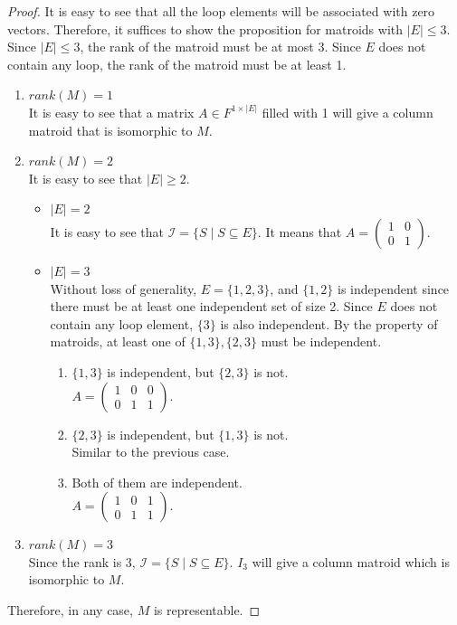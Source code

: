 \begin{proof}
It is easy to see that all the loop elements will be associated with zero vectors.
Therefore, it suffices to show the proposition for matroids with $\lvert E \rvert \leq 3$.
Since $\lvert E \rvert \leq 3$, the rank of the matroid must be at most 3.
Since $E$ does not contain any loop, the rank of the matroid must be at least 1.
\begin{enumerate}
\item $rank(M) = 1$\\
It is easy to see that a matrix $A \in F^{1 \times \lvert E \rvert}$ filled with 1 will give a column matroid that is isomorphic to $M$.
\item $rank(M) = 2$\\
It is easy to see that $\lvert E \rvert \geq 2$.
\begin{itemize}
\item $\lvert E \rvert = 2$\\
It is easy to see that $\mathcal{I} = \{ S \mid S \subseteq E \}$.
It means that $A = \begin{pmatrix} 1 & 0 \\ 0 & 1 \end{pmatrix}$.
\item $\lvert E \rvert = 3$\\
Without loss of generality, $E = \{ 1, 2, 3 \}$, and $\{ 1, 2 \}$ is independent since there must be at least one independent set of size 2.
Since $E$ does not contain any loop element, $\{ 3 \}$ is also independent.
By the property of matroids, at least one of $\{ 1, 3 \}, \{ 2, 3 \}$ must be independent.
\begin{enumerate}
\item $\{ 1, 3 \}$ is independent, but $\{2, 3\}$ is not.\\
  $A = \begin{pmatrix}
        1 & 0 & 0 \\
        0 & 1 & 1
        \end{pmatrix}$.
\item $\{ 2, 3 \}$ is independent, but $\{1, 3\}$ is not.\\
  Similar to the previous case.
\item Both of them are independent. \\
  $A = \begin{pmatrix}
        1 & 0 & 1 \\
        0 & 1 & 1
        \end{pmatrix}$.
\end{enumerate}
\end{itemize}
\item $rank(M) = 3$\\
Since the rank is 3, $\mathcal{I} = \{ S \mid S \subseteq E \}$. $I_3$ will give a column matroid which is isomorphic to $M$.
\end{enumerate}
Therefore, in any case, $M$ is representable.
\end{proof}


